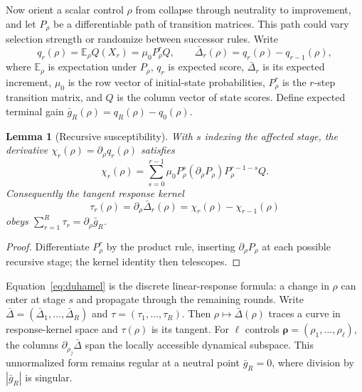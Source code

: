 \documentclass[10pt]{article}
\newtheorem{lemma}{Lemma}
\begin{document}
Now orient a scalar control $\rho$ from collapse through neutrality to improvement, and let $P_\rho$ be a differentiable path of transition matrices. This path could vary selection strength or randomize between successor rules. Write
\begin{equation}\label{eq:rho-trajectory}
q_r(\rho)=\mathbb E_\rho Q(X_r)=\mu_0P_\rho^rQ,
\qquad \bar\Delta_r(\rho)=q_r(\rho)-q_{r-1}(\rho),
\end{equation}
where $\mathbb E_\rho$ is expectation under $P_\rho$, $q_r$ is expected score, $\bar\Delta_r$ is its expected increment, $\mu_0$ is the row vector of initial-state probabilities, $P_\rho^r$ is the $r$-step transition matrix, and $Q$ is the column vector of state scores. Define expected terminal gain $\bar g_R(\rho)=q_R(\rho)-q_0(\rho)$.

\begin{lemma}[Recursive susceptibility]\label{lem:susceptibility}
With $s$ indexing the affected stage, the derivative $\chi_r(\rho)=\partial_\rho q_r(\rho)$ satisfies
\begin{equation}\label{eq:duhamel}
\chi_r(\rho)=\sum_{s=0}^{r-1}
\mu_0P_\rho^s(\partial_\rho P_\rho)
P_\rho^{r-1-s}Q.
\end{equation}
Consequently the tangent response kernel
\begin{equation}\label{eq:tangent-kernel}
\tau_r(\rho)=\partial_\rho\bar\Delta_r(\rho)
=\chi_r(\rho)-\chi_{r-1}(\rho)
\end{equation}
obeys $\sum_{r=1}^{R}\tau_r=\partial_\rho\bar g_R$.
\end{lemma}

\begin{proof}
Differentiate $P_\rho^r$ by the product rule, inserting $\partial_\rho P_\rho$ at each possible recursive stage; the kernel identity then telescopes.
\end{proof}

Equation~\eqref{eq:duhamel} is the discrete linear-response formula: a change in $\rho$ can enter at stage $s$ and propagate through the remaining rounds. Write $\bar\Delta=(\bar\Delta_1,\ldots,\bar\Delta_R)$ and $\tau=(\tau_1,\ldots,\tau_R)$. Then $\rho\mapsto\bar\Delta(\rho)$ traces a curve in response-kernel space and $\tau(\rho)$ is its tangent. For $\ell$ controls $\boldsymbol\rho=(\rho_1,\ldots,\rho_\ell)$, the columns $\partial_{\rho_j}\bar\Delta$ span the locally accessible dynamical subspace. This unnormalized form remains regular at a neutral point $\bar g_R=0$, where division by $|\bar g_R|$ is singular.
\end{document}
